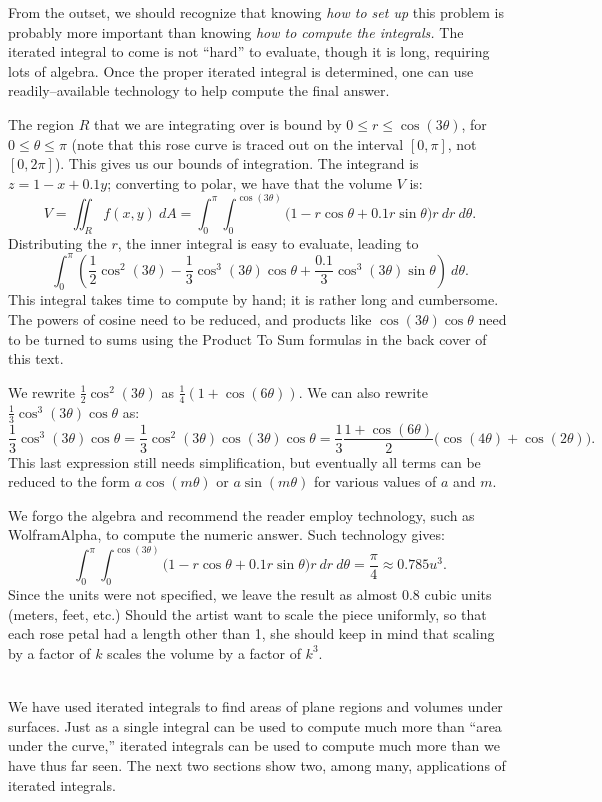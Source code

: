 {From the outset, we should recognize that knowing \textit{how to set up} this problem is probably more important than knowing \textit{how to compute the integrals.} The iterated integral to come is not ``hard'' to evaluate, though it is long, requiring lots of algebra. Once the proper iterated integral is determined, one can use readily--available technology to help  compute the final answer. 

The region $R$ that we are integrating over is bound by $0\leq r\leq \cos(3\theta)$, for $0\leq \theta\leq\pi$ (note that this rose curve is traced out on the interval $[0,\pi]$, not $[0,2\pi]$). This gives us our bounds of integration. The integrand is $z=1-x+0.1y$; converting to polar, we have that the volume $V$ is:
\[
V = \iint_R f(x,y)\ dA = \int_0^\pi\int_0^{\cos(3\theta)}\big(1-r\cos\theta+0.1r\sin\theta\big)r\ dr\ d\theta.
\]
Distributing the $r$, the inner integral is easy to evaluate, leading to 
\[
 \int_0^\pi \left(\frac12\cos^2(3\theta)-\frac13\cos^3(3\theta)\cos\theta+\frac{0.1}3\cos^3(3\theta)\sin\theta\right)\ d\theta.
\]
This integral takes time to compute by hand; it is rather long and cumbersome. The powers of cosine need to be reduced, and products like $\cos(3\theta)\cos\theta$ need to be turned to sums using the Product To Sum formulas in the back cover of this text. 

We rewrite $\frac12\cos^2(3\theta)$ as $\frac14(1+\cos(6\theta))$. We can also rewrite $\frac13\cos^3(3\theta)\cos\theta$ as: 
\[
\frac13\cos^3(3\theta)\cos\theta = \frac13\cos^2(3\theta)\cos(3\theta)\cos\theta = \frac13\frac{1+\cos(6\theta)}2\big(\cos(4\theta)+\cos(2\theta)\big).
\]
This last expression still needs simplification, but eventually all terms can be reduced to the form $a\cos(m\theta)$ or $a\sin(m\theta)$ for various values of $a$ and $m$.

We forgo the algebra and recommend the reader employ technology, such as WolframAlpha\textregistered, to compute the numeric answer. Such technology gives:
\[
\int_0^\pi\int_0^{\cos(3\theta)}\big(1-r\cos\theta+0.1r\sin\theta\big)r\ dr\ d\theta = \frac{\pi}{4} \approx 0.785u^3.
\]
Since the units were not specified, we leave the result as almost $0.8$ cubic units (meters, feet, etc.) Should the artist want to scale the piece uniformly, so that each rose petal had a length other than 1, she should keep in mind that scaling by a factor of $k$ scales the volume by a factor of $k^3$. 
}\\

We have used iterated integrals to find areas of plane regions and volumes under surfaces. Just as a single integral can be used to compute much more than ``area under the curve,'' iterated integrals can be used to compute much more than we have thus far seen. The next two sections show two, among many, applications of iterated integrals.

